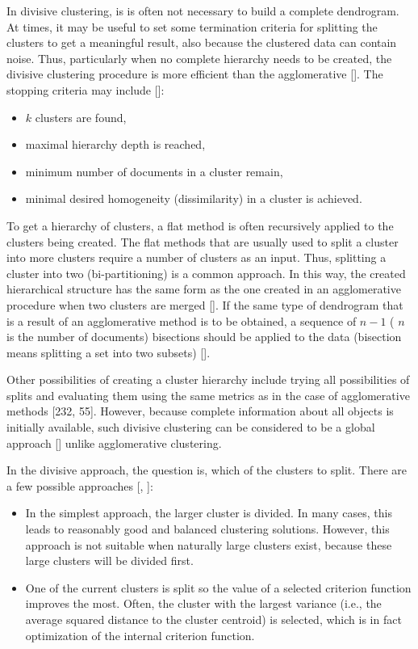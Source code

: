 In divisive clustering, is is often not necessary to build a complete dendrogram. At times, it may be useful to set some termination criteria for splitting the clusters to get a meaningful result, also because the clustered data can contain noise. Thus, particularly when no complete hierarchy needs to be created, the divisive clustering procedure is more efficient than the agglomerative [\cite{ref222}]. The stopping criteria may include [\cite{ref53}]:

\begin{itemize}
  \item $k$ clusters are found,
  \item maximal hierarchy depth is reached,
  \item minimum number of documents in a cluster remain,
  \item minimal desired homogeneity (dissimilarity) in a cluster is achieved.
\end{itemize}

To get a hierarchy of clusters, a flat method is often recursively applied to the clusters being created. The flat methods that are usually used to split a cluster into more clusters require a number of clusters as an input. Thus, splitting a cluster into two (bi-partitioning) is a common approach. In this way, the created hierarchical structure has the same form as the one created in an agglomerative procedure when two clusters are merged [\cite{ref53}]. If the same type of dendrogram that is a result of an agglomerative method is to be obtained, a sequence of $n-1$ ( $n$ is the number of documents) bisections should be applied to the data (bisection means splitting a set into two subsets) [\cite{ref293}].

Other possibilities of creating a cluster hierarchy include trying all possibilities of splits and evaluating them using the same metrics as in the case of agglomerative methods [232, 55]. However, because complete information about all objects is initially available, such divisive clustering can be considered to be a global approach [\cite{ref222}] unlike agglomerative clustering.

In the divisive approach, the question is, which of the clusters to split. There are a few possible approaches [\cite{ref294}, \cite{ref240}]:

\begin{itemize}
  \item In the simplest approach, the larger cluster is divided. In many cases, this leads to reasonably good and balanced clustering solutions. However, this approach is not suitable when naturally large clusters exist, because these large clusters will be divided first.
  \item One of the current clusters is split so the value of a selected criterion function improves the most. Often, the cluster with the largest variance (i.e., the average squared distance to the cluster centroid) is selected, which is in fact optimization of the internal criterion function.
\end{itemize}


